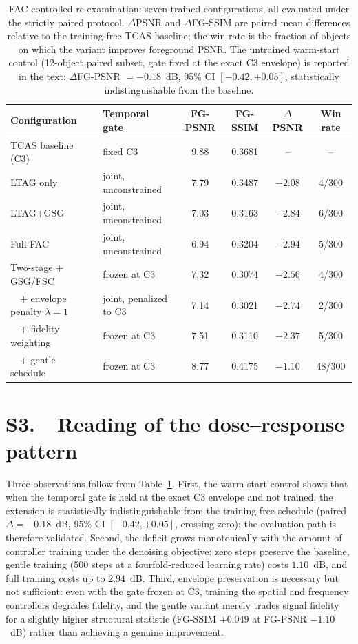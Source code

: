 \documentclass[10pt]{article}
\begin{document}
\begin{table}[h]
\centering\small
\caption{FAC controlled re-examination: seven trained configurations, all evaluated under the strictly paired protocol. $\Delta$PSNR and $\Delta$FG-SSIM are paired mean differences relative to the training-free TCAS baseline; the win rate is the fraction of objects on which the variant improves foreground PSNR. The untrained warm-start control (12-object paired subset, gate fixed at the exact C3 envelope) is reported in the text: $\Delta$FG-PSNR $=-0.18$~dB, 95\% CI $[-0.42,+0.05]$, statistically indistinguishable from the baseline.}
\label{tab:fac_dose}
\begin{tabular}{llcccc}
\toprule
Configuration & Temporal gate & FG-PSNR & FG-SSIM & $\Delta$PSNR & Win rate \\
\midrule
TCAS baseline (C3) & fixed C3 & 9.88 & 0.3681 & -- & -- \\
\midrule
LTAG only & joint, unconstrained & 7.79 & 0.3487 & $-2.08$ & 4/300 \\
LTAG+GSG & joint, unconstrained & 7.03 & 0.3163 & $-2.84$ & 6/300 \\
Full FAC & joint, unconstrained & 6.94 & 0.3204 & $-2.94$ & 5/300 \\
Two-stage + GSG/FSC & frozen at C3 & 7.32 & 0.3074 & $-2.56$ & 4/300 \\
\ \ + envelope penalty $\lambda{=}1$ & joint, penalized to C3 & 7.14 & 0.3021 & $-2.74$ & 2/300 \\
\ \ + fidelity weighting & frozen at C3 & 7.51 & 0.3110 & $-2.37$ & 5/300 \\
\ \ + gentle schedule & frozen at C3 & 8.77 & 0.4175 & $-1.10$ & 48/300 \\
\bottomrule
\end{tabular}
\end{table}

\section{S3.\ \ Reading of the dose--response pattern}

Three observations follow from Table~\ref{tab:fac_dose}. First, the warm-start control shows that when the temporal gate is held at the exact C3 envelope and not trained, the extension is statistically indistinguishable from the training-free schedule (paired $\Delta=-0.18$~dB, 95\% CI $[-0.42,+0.05]$, crossing zero); the evaluation path is therefore validated. Second, the deficit grows monotonically with the amount of controller training under the denoising objective: zero steps preserve the baseline, gentle training (500 steps at a fourfold-reduced learning rate) costs $1.10$~dB, and full training costs up to $2.94$~dB. Third, envelope preservation is necessary but not sufficient: even with the gate frozen at C3, training the spatial and frequency controllers degrades fidelity, and the gentle variant merely trades signal fidelity for a slightly higher structural statistic (FG-SSIM $+0.049$ at FG-PSNR $-1.10$~dB) rather than achieving a genuine improvement.
\end{document}
